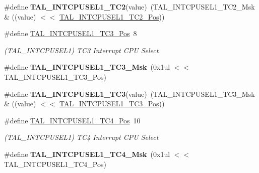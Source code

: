 \begin{DoxyCompactItemize}
\item 
\hypertarget{group___s_a_m_l21___t_a_l_gaf09bc5d8138babd3665357a0b0245ac1}{}\#define {\bfseries T\+A\+L\+\_\+\+I\+N\+T\+C\+P\+U\+S\+E\+L1\+\_\+\+T\+C2}(value)~(T\+A\+L\+\_\+\+I\+N\+T\+C\+P\+U\+S\+E\+L1\+\_\+\+T\+C2\+\_\+\+Msk \& ((value) $<$$<$ \hyperlink{group___s_a_m_l21___t_a_l_gac9d7a1126dbf287f67473b723c5205c6}{T\+A\+L\+\_\+\+I\+N\+T\+C\+P\+U\+S\+E\+L1\+\_\+\+T\+C2\+\_\+\+Pos}))\label{group___s_a_m_l21___t_a_l_gaf09bc5d8138babd3665357a0b0245ac1}

\item 
\hypertarget{group___s_a_m_l21___t_a_l_ga1de3ba6694022f4ead322fb23e9771ef}{}\#define \hyperlink{group___s_a_m_l21___t_a_l_ga1de3ba6694022f4ead322fb23e9771ef}{T\+A\+L\+\_\+\+I\+N\+T\+C\+P\+U\+S\+E\+L1\+\_\+\+T\+C3\+\_\+\+Pos}~8\label{group___s_a_m_l21___t_a_l_ga1de3ba6694022f4ead322fb23e9771ef}

\begin{DoxyCompactList}\small\item\em (T\+A\+L\+\_\+\+I\+N\+T\+C\+P\+U\+S\+E\+L1) T\+C3 Interrupt C\+P\+U Select \end{DoxyCompactList}\item 
\hypertarget{group___s_a_m_l21___t_a_l_gad638364426da7dfac24eed28d885cb9d}{}\#define {\bfseries T\+A\+L\+\_\+\+I\+N\+T\+C\+P\+U\+S\+E\+L1\+\_\+\+T\+C3\+\_\+\+Msk}~(0x1ul $<$$<$ T\+A\+L\+\_\+\+I\+N\+T\+C\+P\+U\+S\+E\+L1\+\_\+\+T\+C3\+\_\+\+Pos)\label{group___s_a_m_l21___t_a_l_gad638364426da7dfac24eed28d885cb9d}

\item 
\hypertarget{group___s_a_m_l21___t_a_l_ga539d2741de8a50860b0b0dca4b9e4418}{}\#define {\bfseries T\+A\+L\+\_\+\+I\+N\+T\+C\+P\+U\+S\+E\+L1\+\_\+\+T\+C3}(value)~(T\+A\+L\+\_\+\+I\+N\+T\+C\+P\+U\+S\+E\+L1\+\_\+\+T\+C3\+\_\+\+Msk \& ((value) $<$$<$ \hyperlink{group___s_a_m_l21___t_a_l_ga1de3ba6694022f4ead322fb23e9771ef}{T\+A\+L\+\_\+\+I\+N\+T\+C\+P\+U\+S\+E\+L1\+\_\+\+T\+C3\+\_\+\+Pos}))\label{group___s_a_m_l21___t_a_l_ga539d2741de8a50860b0b0dca4b9e4418}

\item 
\hypertarget{group___s_a_m_l21___t_a_l_ga425a6efc1066c74524341cb740b39f06}{}\#define \hyperlink{group___s_a_m_l21___t_a_l_ga425a6efc1066c74524341cb740b39f06}{T\+A\+L\+\_\+\+I\+N\+T\+C\+P\+U\+S\+E\+L1\+\_\+\+T\+C4\+\_\+\+Pos}~10\label{group___s_a_m_l21___t_a_l_ga425a6efc1066c74524341cb740b39f06}

\begin{DoxyCompactList}\small\item\em (T\+A\+L\+\_\+\+I\+N\+T\+C\+P\+U\+S\+E\+L1) T\+C4 Interrupt C\+P\+U Select \end{DoxyCompactList}\item 
\hypertarget{group___s_a_m_l21___t_a_l_ga08de66960fb0f68334c41fb1481919e4}{}\#define {\bfseries T\+A\+L\+\_\+\+I\+N\+T\+C\+P\+U\+S\+E\+L1\+\_\+\+T\+C4\+\_\+\+Msk}~(0x1ul $<$$<$ T\+A\+L\+\_\+\+I\+N\+T\+C\+P\+U\+S\+E\+L1\+\_\+\+T\+C4\+\_\+\+Pos)\label{group___s_a_m_l21___t_a_l_ga08de66960fb0f68334c41fb1481919e4}


\end{DoxyCompactItemize}

